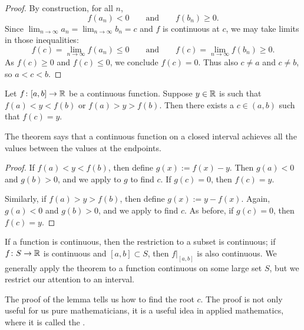 \begin{proof}
By construction, for all $n$,
\begin{equation*}
f(a_n) < 0
\qquad \text{and} \qquad
f(b_n) \geq 0 .
\end{equation*}
Since
$\lim_{n\to\infty} a_n = \lim_{n\to\infty} b_n = c$
and $f$ is continuous at $c$, we may take 
limits in those inequalities:
\begin{equation*}
f(c) = \lim_{n\to\infty} f(a_n) \leq 0
\qquad \text{and} \qquad
f(c) = \lim_{n\to\infty} f(b_n) \geq 0 .
\end{equation*}
As $f(c) \geq 0$ and 
$f(c) \leq 0$, we conclude $f(c) = 0$.
Thus also $c \not=a$ and $c \not= b$, so
$a < c < b$.
\end{proof}

\begin{thm} \label{IVT:thm}
Let $f \colon [a,b] \to {\mathbb{R}}$ be a continuous function.
Suppose $y \in {\mathbb{R}}$ is such that $f(a) < y < f(b)$
or $f(a) > y > f(b)$.  Then there exists a $c \in (a,b)$
such that $f(c) = y$.
\end{thm}

The theorem says that a continuous function on a closed interval
achieves all the values between the values at the endpoints.

\begin{proof}
If $f(a) < y < f(b)$, then define $g(x) := f(x)-y$.  Then 
$g(a) < 0$ and $g(b) > 0$, and we apply 
to $g$ to find $c$.  If $g(c) = 0$, then $f(c) = y$.

Similarly, if $f(a) > y > f(b)$, then define $g(x) := y-f(x)$.
Again, $g(a) < 0$ and $g(b) > 0$, and we apply  to
find $c$.
As before, if $g(c) = 0$, then $f(c) = y$.
\end{proof}

If a function is continuous, then the restriction
to a subset is continuous; if $f \colon S \to {\mathbb{R}}$ is continuous and
$[a,b] \subset S$, then $f|_{[a,b]}$ is also continuous.  We generally
apply the theorem to a function continuous on some large set $S$,
but we restrict our attention to an interval.


The proof of the lemma tells us how to find the root $c$.  The
proof is not only useful for us pure mathematicians,
it is a useful idea in applied mathematics,
where it is called the \emph{}.


